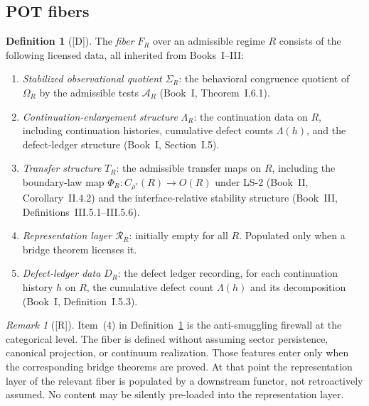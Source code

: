 \documentclass[12pt,oneside]{amsbook}
\theoremstyle{plain}
\theoremstyle{definition}
\newtheorem{definition}[theorem]{Definition}
\theoremstyle{remark}
\newtheorem{remark}[theorem]{Remark}
\newcommand{\status}[1]{\textup{[#1]}}
\begin{document}
\subsection*{POT fibers}

\begin{definition}[\status{D}]\label{def:fiber}
The \emph{fiber} $F_R$ over an admissible regime $R$ consists of the
following licensed data, all inherited from Books~I--III:
\begin{enumerate}[label=\textup{(\arabic*)}]
  \item \emph{Stabilized observational quotient} $\Sigma_R$: the
        behavioral congruence quotient of $\Omega_R$ by the admissible
        tests $\mathcal{A}_R$ (Book~I, Theorem~I.6.1).
  \item \emph{Continuation-enlargement structure} $\Lambda_R$: the
        continuation data on $R$, including continuation histories,
        cumulative defect counts $\Lambda(h)$, and the defect-ledger
        structure (Book~I, Section~I.5).
  \item \emph{Transfer structure} $T_R$: the admissible transfer maps
        on $R$, including the boundary-law map $\Phi_R: C_{\rho^*}(R)
        \to O(R)$ under LS-2 (Book~II, Corollary~II.4.2) and the
        interface-relative stability structure (Book~III,
        Definitions~III.5.1--III.5.6).
  \item \emph{Representation layer} $\mathcal{R}_R$: initially empty
        for all $R$.  Populated only when a bridge theorem licenses it.
  \item \emph{Defect-ledger data} $D_R$: the defect ledger recording,
        for each continuation history $h$ on $R$, the cumulative
        defect count $\Lambda(h)$ and its decomposition (Book~I,
        Definition~I.5.3).
\end{enumerate}
\end{definition}

\begin{remark}[\status{R}]\label{rmk:rep-layer-empty}
Item~(4) in Definition~\ref{def:fiber} is the anti-smuggling firewall
at the categorical level.  The fiber is defined without assuming
sector persistence, canonical projection, or continuum realization.
Those features enter only when the corresponding bridge theorems are
proved.  At that point the representation layer of the relevant fiber
is populated by a downstream functor, not retroactively assumed.  No
content may be silently pre-loaded into the representation layer.
\end{remark}
\end{document}
